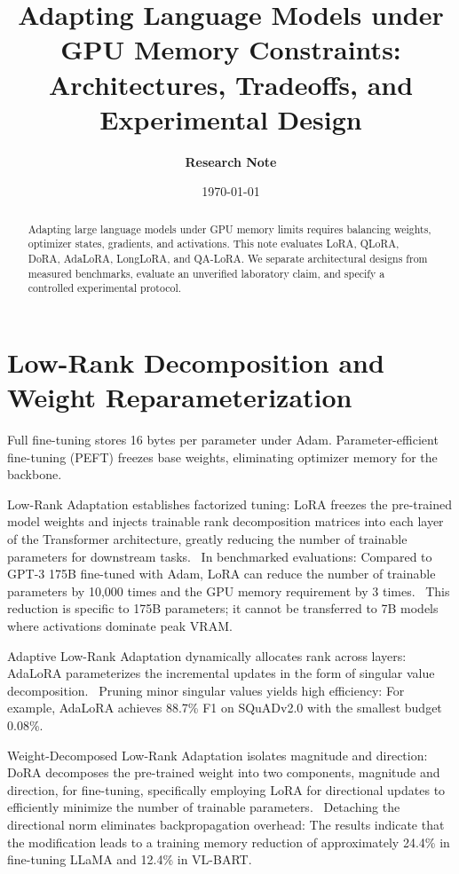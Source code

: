 \documentclass[11pt,a4paper]{article}
\title{\textbf{Adapting Language Models under GPU Memory Constraints:\\Architectures, Tradeoffs, and Experimental Design}}
\author{\textbf{Research Note}}
\date{\today}
\begin{document}
\maketitle

\begin{abstract}
Adapting large language models under GPU memory limits requires balancing weights, optimizer states, gradients, and activations. This note evaluates LoRA, QLoRA, DoRA, AdaLoRA, LongLoRA, and QA-LoRA. We separate architectural designs from measured benchmarks, evaluate an unverified laboratory claim, and specify a controlled experimental protocol.
\end{abstract}

\section{Low-Rank Decomposition and Weight Reparameterization}

Full fine-tuning stores 16 bytes per parameter under Adam. Parameter-efficient fine-tuning (PEFT) freezes base weights, eliminating optimizer memory for the backbone.

Low-Rank Adaptation establishes factorized tuning: LoRA freezes the pre-trained model weights and injects trainable rank decomposition matrices into each layer of the Transformer architecture, greatly reducing the number of trainable parameters for downstream tasks.~\cite{hu2021lora} In benchmarked evaluations: Compared to GPT-3 175B fine-tuned with Adam, LoRA can reduce the number of trainable parameters by 10,000 times and the GPU memory requirement by 3 times.~\cite{hu2021lora} This reduction is specific to 175B parameters; it cannot be transferred to 7B models where activations dominate peak VRAM.

Adaptive Low-Rank Adaptation dynamically allocates rank across layers: AdaLoRA parameterizes the incremental updates in the form of singular value decomposition.~\cite{zhang2023adalora} Pruning minor singular values yields high efficiency: For example, AdaLoRA achieves 88.7\% F1 on SQuADv2.0 with the smallest budget 0.08\%.~\cite{zhang2023adalora}

Weight-Decomposed Low-Rank Adaptation isolates magnitude and direction: DoRA decomposes the pre-trained weight into two components, magnitude and direction, for fine-tuning, specifically employing LoRA for directional updates to efficiently minimize the number of trainable parameters.~\cite{liu2024dora} Detaching the directional norm eliminates backpropagation overhead: The results indicate that the modification leads to a training memory reduction of approximately 24.4\% in fine-tuning LLaMA and 12.4\% in VL-BART.~\cite{liu2024dora}
\end{document}
